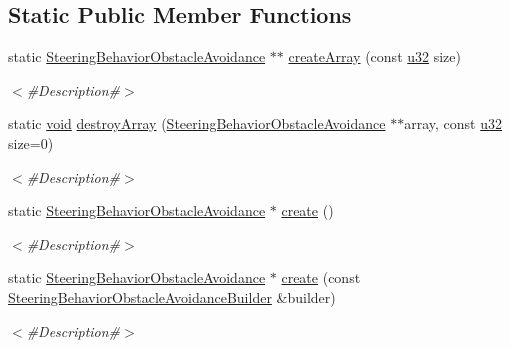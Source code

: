 \subsection*{Static Public Member Functions}
\begin{DoxyCompactItemize}
\item 
static \mbox{\hyperlink{classnjli_1_1_steering_behavior_obstacle_avoidance}{Steering\+Behavior\+Obstacle\+Avoidance}} $\ast$$\ast$ \mbox{\hyperlink{classnjli_1_1_steering_behavior_obstacle_avoidance_a8ea948f8b9b36f9cc9842595bf5a1913}{create\+Array}} (const \mbox{\hyperlink{_util_8h_a10e94b422ef0c20dcdec20d31a1f5049}{u32}} size)
\begin{DoxyCompactList}\small\item\em $<$\#\+Description\#$>$ \end{DoxyCompactList}\item 
static \mbox{\hyperlink{_thread_8h_af1e856da2e658414cb2456cb6f7ebc66}{void}} \mbox{\hyperlink{classnjli_1_1_steering_behavior_obstacle_avoidance_aa410ec99d4715bfd40e7b644c93583b8}{destroy\+Array}} (\mbox{\hyperlink{classnjli_1_1_steering_behavior_obstacle_avoidance}{Steering\+Behavior\+Obstacle\+Avoidance}} $\ast$$\ast$array, const \mbox{\hyperlink{_util_8h_a10e94b422ef0c20dcdec20d31a1f5049}{u32}} size=0)
\begin{DoxyCompactList}\small\item\em $<$\#\+Description\#$>$ \end{DoxyCompactList}\item 
static \mbox{\hyperlink{classnjli_1_1_steering_behavior_obstacle_avoidance}{Steering\+Behavior\+Obstacle\+Avoidance}} $\ast$ \mbox{\hyperlink{classnjli_1_1_steering_behavior_obstacle_avoidance_a365bf7d036f2784e9b8fb9b0f2c48373}{create}} ()
\begin{DoxyCompactList}\small\item\em $<$\#\+Description\#$>$ \end{DoxyCompactList}\item 
static \mbox{\hyperlink{classnjli_1_1_steering_behavior_obstacle_avoidance}{Steering\+Behavior\+Obstacle\+Avoidance}} $\ast$ \mbox{\hyperlink{classnjli_1_1_steering_behavior_obstacle_avoidance_a6adc72d7ab3697d4da65cbd1d549b3c0}{create}} (const \mbox{\hyperlink{classnjli_1_1_steering_behavior_obstacle_avoidance_builder}{Steering\+Behavior\+Obstacle\+Avoidance\+Builder}} \&builder)
\begin{DoxyCompactList}\small\item\em $<$\#\+Description\#$>$ \end{DoxyCompactList}\item 

\end{DoxyCompactItemize}
